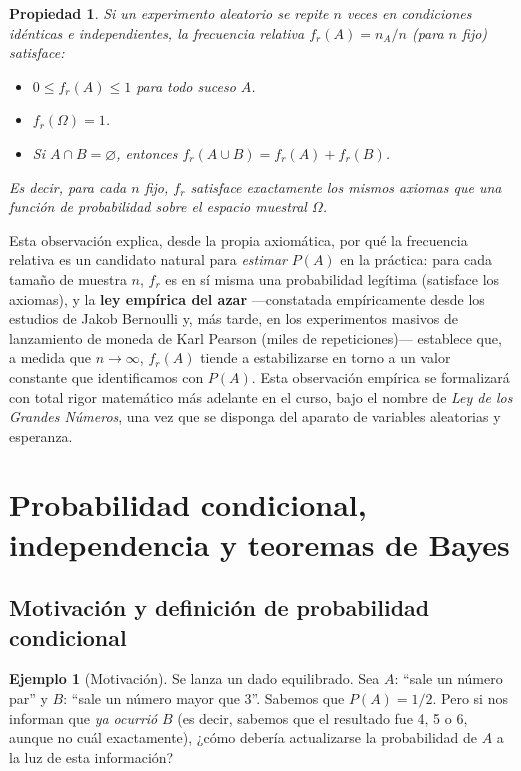 \documentclass[11pt,a4paper]{article}
\theoremstyle{plain}
\newtheorem{propiedad}[teorema]{Propiedad}
\theoremstyle{definition}
\newtheorem{ejemplo}[teorema]{Ejemplo}
\theoremstyle{remark}
\begin{document}
\begin{propiedad}
Si un experimento aleatorio se repite $n$ veces en condiciones idénticas e independientes, la frecuencia relativa $f_r(A)=n_A/n$ (para $n$ fijo) satisface:
\begin{itemize}
\item $0 \leq f_r(A) \leq 1$ para todo suceso $A$.
\item $f_r(\Omega) = 1$.
\item Si $A\cap B=\varnothing$, entonces $f_r(A\cup B) = f_r(A)+f_r(B)$.
\end{itemize}
Es decir, para cada $n$ fijo, $f_r$ satisface exactamente los mismos axiomas que una función de probabilidad sobre el espacio muestral $\Omega$.
\end{propiedad}

Esta observación explica, desde la propia axiomática, por qué la frecuencia relativa es un candidato natural para \emph{estimar} $P(A)$ en la práctica: para cada tamaño de muestra $n$, $f_r$ es en sí misma una probabilidad legítima (satisface los axiomas), y la \textbf{ley empírica del azar} —constatada empíricamente desde los estudios de Jakob Bernoulli y, más tarde, en los experimentos masivos de lanzamiento de moneda de Karl Pearson (miles de repeticiones)— establece que, a medida que $n\to\infty$, $f_r(A)$ tiende a estabilizarse en torno a un valor constante que identificamos con $P(A)$. Esta observación empírica se formalizará con total rigor matemático más adelante en el curso, bajo el nombre de \emph{Ley de los Grandes Números}, una vez que se disponga del aparato de variables aleatorias y esperanza.

\newpage
\section{Probabilidad condicional, independencia y teoremas de Bayes}

\subsection{Motivación y definición de probabilidad condicional}

\begin{ejemplo}[Motivación]
Se lanza un dado equilibrado. Sea $A$: ``sale un número par'' y $B$: ``sale un número mayor que 3''. Sabemos que $P(A)=1/2$. Pero si nos informan que \emph{ya ocurrió} $B$ (es decir, sabemos que el resultado fue 4, 5 o 6, aunque no cuál exactamente), ¿cómo debería actualizarse la probabilidad de $A$ a la luz de esta información?
\end{ejemplo}
\end{document}
